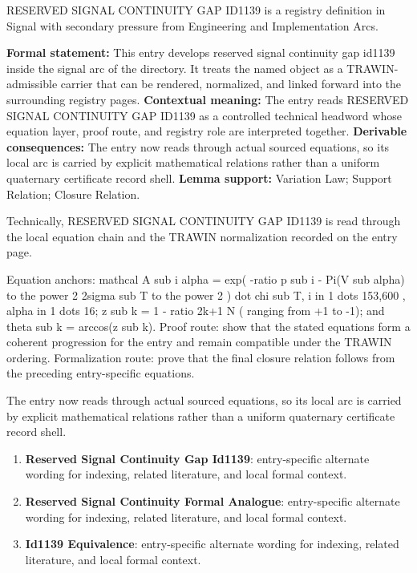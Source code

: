 
\begingroup\small
{}
RESERVED SIGNAL CONTINUITY GAP ID1139 is a registry definition in Signal with secondary pressure from Engineering and Implementation Arcs.

\begingroup\footnotesize\setlength{\emergencystretch}{3em}\sloppy
\textbf{Formal statement:} This entry develops reserved signal continuity gap id1139 inside the signal arc of the directory. It treats the named object as a TRAWIN-admissible carrier that can be rendered, normalized, and linked forward into the surrounding registry pages. \textbf{Contextual meaning:} The entry reads RESERVED SIGNAL CONTINUITY GAP ID1139 as a controlled technical headword whose equation layer, proof route, and registry role are interpreted together. \textbf{Derivable consequences:} The entry now reads through actual sourced equations, so its local arc is carried by explicit mathematical relations rather than a uniform quaternary certificate record shell. \textbf{Lemma support:} Variation Law; Support Relation; Closure Relation.\par
\endgroup

Technically, RESERVED SIGNAL CONTINUITY GAP ID1139 is read through the local equation chain and the TRAWIN normalization recorded on the entry page.

Equation anchors: mathcal A sub i alpha = exp( -ratio p sub i - Pi(V sub alpha) to the power 2 2sigma sub T to the power 2 ) dot chi sub T, i in 1 dots 153,600 , alpha in 1 dots 16; z sub k = 1 - ratio 2k+1 N ( ranging from +1 to -1); and theta sub k = arccos(z sub k). Proof route: show that the stated equations form a coherent progression for the entry and remain compatible under the TRAWIN ordering. Formalization route: prove that the final closure relation follows from the preceding entry-specific equations.

The entry now reads through actual sourced equations, so its local arc is carried by explicit mathematical relations rather than a uniform quaternary certificate record shell.
\endgroup

\begin{enumerate}[leftmargin=1.6em,itemsep=6pt,topsep=4pt]
\item \textbf{Reserved Signal Continuity Gap Id1139}: entry-specific alternate wording for indexing, related literature, and local formal context.
\item \textbf{Reserved Signal Continuity Formal Analogue}: entry-specific alternate wording for indexing, related literature, and local formal context.
\item \textbf{Id1139 Equivalence}: entry-specific alternate wording for indexing, related literature, and local formal context.
\end{enumerate}

